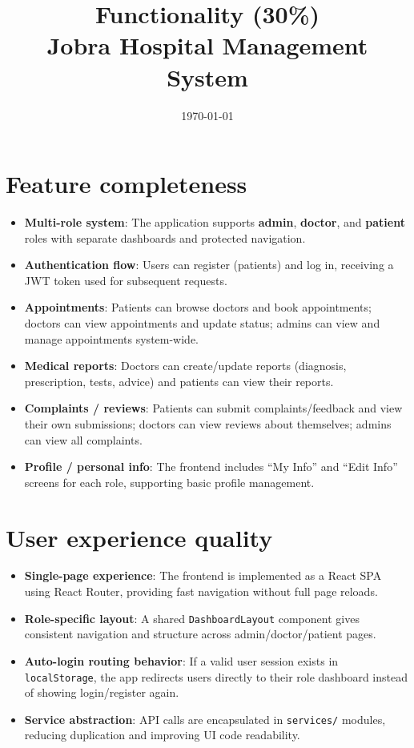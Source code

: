 \documentclass[12pt,a4paper]{article}
\title{Functionality (30\%)\\Jobra Hospital Management System}
\author{}
\date{\today}
\begin{document}
\maketitle

\section{Feature completeness}
\begin{itemize}[leftmargin=*, itemsep=0.4em]
  \item \textbf{Multi-role system}: The application supports \textbf{admin}, \textbf{doctor}, and \textbf{patient} roles with separate dashboards and protected navigation.
  \item \textbf{Authentication flow}: Users can register (patients) and log in, receiving a JWT token used for subsequent requests.
  \item \textbf{Appointments}: Patients can browse doctors and book appointments; doctors can view appointments and update status; admins can view and manage appointments system-wide.
  \item \textbf{Medical reports}: Doctors can create/update reports (diagnosis, prescription, tests, advice) and patients can view their reports.
  \item \textbf{Complaints / reviews}: Patients can submit complaints/feedback and view their own submissions; doctors can view reviews about themselves; admins can view all complaints.
  \item \textbf{Profile / personal info}: The frontend includes ``My Info'' and ``Edit Info'' screens for each role, supporting basic profile management.
\end{itemize}

\section{User experience quality}
\begin{itemize}[leftmargin=*, itemsep=0.4em]
  \item \textbf{Single-page experience}: The frontend is implemented as a React SPA using React Router, providing fast navigation without full page reloads.
  \item \textbf{Role-specific layout}: A shared \texttt{DashboardLayout} component gives consistent navigation and structure across admin/doctor/patient pages.
  \item \textbf{Auto-login routing behavior}: If a valid user session exists in \texttt{localStorage}, the app redirects users directly to their role dashboard instead of showing login/register again.
  \item \textbf{Service abstraction}: API calls are encapsulated in \texttt{services/} modules, reducing duplication and improving UI code readability.
\end{itemize}
\end{document}
